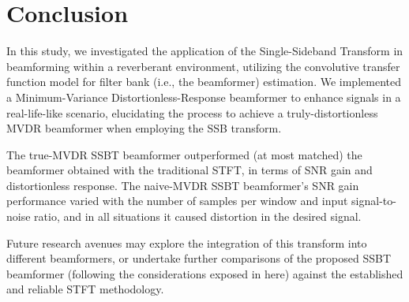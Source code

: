 \section{Conclusion}
\label{sec:conclusion}

In this study, we investigated the application of the Single-Sideband Transform in beamforming within a reverberant environment, utilizing the convolutive transfer function model for filter bank (i.e., the beamformer) estimation. We implemented a Minimum-Variance Distortionless-Response beamformer to enhance signals in a real-life-like scenario, elucidating the process to achieve a truly-distortionless MVDR beamformer when employing the SSB transform.

The true-MVDR SSBT beamformer outperformed (at most matched) the beamformer obtained with the traditional STFT, in terms of SNR gain and distortionless response. The naive-MVDR SSBT beamformer's SNR gain performance varied with the number of samples per window and input signal-to-noise ratio, and in all situations it caused distortion in the desired signal.

Future research avenues may explore the integration of this transform into different beamformers, or undertake further comparisons of the proposed SSBT beamformer (following the considerations exposed in here) against the established and reliable STFT methodology.